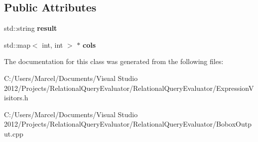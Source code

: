 \subsection*{Public Attributes}
\begin{DoxyCompactItemize}
\item 
\hypertarget{class_bobox_writing_expression_visitor_a222842d9f796beebabc13691b107e5ad}{std\+::string {\bfseries result}}\label{class_bobox_writing_expression_visitor_a222842d9f796beebabc13691b107e5ad}

\item 
\hypertarget{class_bobox_writing_expression_visitor_a6e0d9ba1a06fd32c8d71dd8e1c068c56}{std\+::map$<$ int, int $>$ $\ast$ {\bfseries cols}}\label{class_bobox_writing_expression_visitor_a6e0d9ba1a06fd32c8d71dd8e1c068c56}

\end{DoxyCompactItemize}


The documentation for this class was generated from the following files\+:\begin{DoxyCompactItemize}
\item 
C\+:/\+Users/\+Marcel/\+Documents/\+Visual Studio 2012/\+Projects/\+Relational\+Query\+Evaluator/\+Relational\+Query\+Evaluator/Expression\+Visitors.\+h\item 
C\+:/\+Users/\+Marcel/\+Documents/\+Visual Studio 2012/\+Projects/\+Relational\+Query\+Evaluator/\+Relational\+Query\+Evaluator/Bobox\+Output.\+cpp\end{DoxyCompactItemize}
